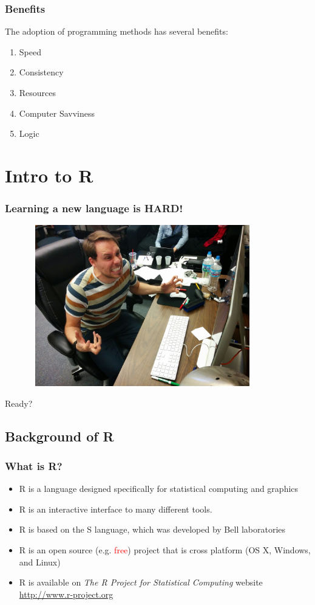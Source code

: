 \documentclass{beamer}\usepackage[]{graphicx}\usepackage[]{color}
\begin{document}
\begin{frame}
\frametitle{Benefits}

The adoption of programming methods has several benefits:
\begin{enumerate}
\item Speed
\item Consistency
\item Resources
\item Computer Savviness
\item Logic
\end{enumerate}
\end{frame}


\section{Intro to R}


\begin{frame}
\frametitle{Learning a new language is HARD!}
\begin{center}
\includegraphics[height=7cm, width=12cm]{roberto_smash.jpg}
\end{center}
\end{frame}


\begin{frame}
\begin{center}
\Huge Ready?
\end{center}
\end{frame}


\subsection{Background of R}

\begin{frame}
\frametitle{What is R?}
\begin{itemize}
\item R is a language designed specifically for statistical computing and graphics
\item R is an interactive interface to many different tools.
\item R is based on the S language, which was developed by Bell laboratories
\item R is an open source (e.g. \textcolor{red}{free}) project that is cross platform (OS X, Windows, and Linux)
\item R is available on \textit{The R Project for Statistical Computing} website \href{http://www.r-project.org}{http://www.r-project.org}
\end{itemize}
\end{frame}
\end{document}
